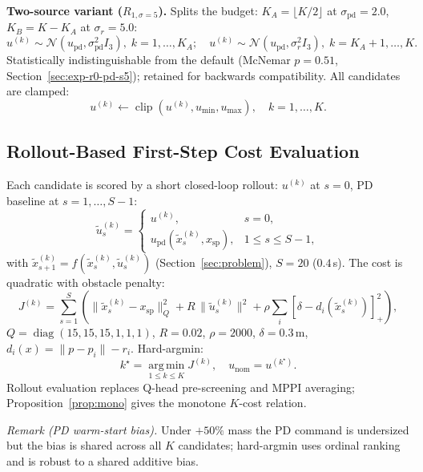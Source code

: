 \documentclass[11pt,onecolumn,a4paper]{article}
\newcommand{\spt}{\mathrm{sp}}
\newcommand{\pd}{\mathrm{pd}}
\newcommand{\nom}{\mathrm{nom}}
\begin{document}
\textbf{Two-source variant ($R_{1,\sigma=5}$).} Splits the budget:
$K_A = \lfloor K/2 \rfloor$ at $\sigma_\pd = 2.0$, $K_B = K - K_A$
at $\sigma_r = 5.0$:
\begin{equation}\label{eq:srcB}
u^{(k)} \sim \mathcal{N}(u_\pd, \sigma_\pd^2 I_3),\; k = 1, \ldots, K_A;\quad
u^{(k)} \sim \mathcal{N}(u_\pd, \sigma_r^2 I_3),\; k = K_A{+}1, \ldots, K.
\end{equation}
Statistically indistinguishable from the default
(McNemar $p = 0.51$, Section~\ref{sec:exp-r0-pd-s5}); retained for
backwards compatibility. All candidates are clamped:
\begin{equation}\label{eq:clip}
u^{(k)} \leftarrow \operatorname{clip}(u^{(k)}, u_{\min}, u_{\max}),
\quad k = 1, \ldots, K.
\end{equation}

\subsection{Rollout-Based First-Step Cost Evaluation}

Each candidate is scored by a short closed-loop rollout: $u^{(k)}$ at
$s=0$, PD baseline at $s=1,\dots,S-1$:
\begin{equation}\label{eq:rollout}
\tilde{u}_s^{(k)} =
\begin{cases}
u^{(k)}, & s = 0, \\
u_\pd(\tilde{x}_s^{(k)}, x_\spt), & 1 \le s \le S-1,
\end{cases}
\end{equation}
with $\tilde{x}_{s+1}^{(k)} = f(\tilde{x}_s^{(k)}, \tilde{u}_s^{(k)})$
(Section~\ref{sec:problem}), $S = 20$ ($0.4\,$s). The cost is quadratic
with obstacle penalty:
\begin{equation}\label{eq:cost}
J^{(k)} = \sum_{s=1}^{S}\!\!\left(\!\|\tilde{x}_s^{(k)} - x_\spt\|_Q^2
+ R\,\|\tilde{u}_s^{(k)}\|^2
+ \rho \sum_i [\delta - d_i(\tilde{x}_s^{(k)})]_+^2\!\right),
\end{equation}
$Q = \operatorname{diag}(15,15,15,1,1,1)$, $R = 0.02$, $\rho = 2000$,
$\delta = 0.3\,$m, $d_i(x) = \|p - p_i\| - r_i$. Hard-argmin:
\begin{equation}\label{eq:argmin}
k^\star = \operatorname*{arg\,min}_{1 \le k \le K} J^{(k)},
\quad u_\nom = u^{(k^\star)}.
\end{equation}
Rollout evaluation replaces Q-head pre-screening and MPPI averaging;
Proposition~\ref{prop:mono} gives the monotone $K$-cost relation.

\emph{Remark (PD warm-start bias).} Under $+50\%$ mass the PD command
is undersized but the bias is shared across all $K$ candidates;
hard-argmin uses ordinal ranking and is robust to a shared additive
bias.
\end{document}
